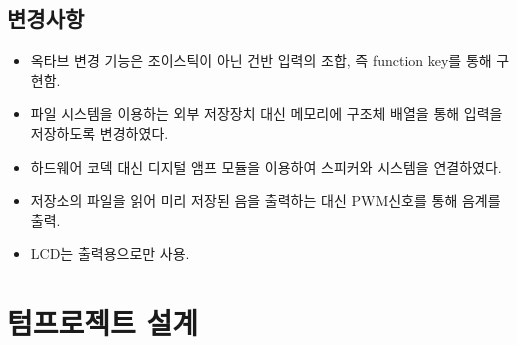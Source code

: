 \documentclass[a4paper,11pt]{article}
\begin{document}
\begin{spacing}{1.6}
 \subsection{변경사항}
 \begin{itemize}
   \item 옥타브 변경 기능은 조이스틱이 아닌 건반 입력의 조합, 즉 function key를 통해 구현함.
   \item 파일 시스템을 이용하는 외부 저장장치 대신 메모리에 구조체 배열을 통해 입력을 저장하도록 변경하였다.
   \item 하드웨어 코덱 대신 디지털 앰프 모듈을 이용하여 스피커와 시스템을 연결하였다.
   \item 저장소의 파일을 읽어 미리 저장된 음을 출력하는 대신 PWM신호를 통해 음계를 출력.
   \item LCD는 출력용으로만 사용.
 \end{itemize}

\section{텀프로젝트 설계}

\end{spacing}
\end{document}
